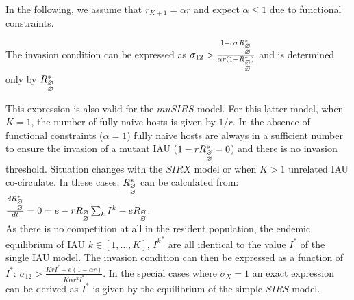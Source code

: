 In the following, we assume that $r_{K+1}=\alpha r$ and expect $\alpha
\leq 1$ due to functional constraints.

The invasion condition can be expressed as $\sigma_{12} > \frac{1-\alpha
  r R_{\begin{subarray}{l}\varnothing \\
      \varnothing \end{subarray}}^*}{\alpha
  r(1-R_{\begin{subarray}{l}\varnothing \\
      \varnothing \end{subarray}}^*)}$ and is determined only by
$R_{\begin{subarray}{l}\varnothing \\ \varnothing \end{subarray}}^*$


This expression is also valid for the $muSIRS$ model. For this latter
model, when $K=1$, the number of fully naive hosts is given by
$1/r$. In the absence of functional constraints ($\alpha=1$) fully
naive hosts are always in a sufficient number to ensure the invasion
of a mutant IAU ($1-r R_{\begin{subarray}{l}\varnothing \\
    \varnothing \end{subarray}}^*=0$) and there is no invasion
threshold.  Situation changes with the $SIRX$ model or when $K>1$
unrelated IAU co-circulate. In these cases,
$R_{\begin{subarray}{l}\varnothing \\ \varnothing \end{subarray}}^*$
can be calculated from: $\frac{dR_{\begin{subarray}{l}\varnothing \\
      \varnothing \end{subarray}}^*}{dt} = 0 = e -r
R_{\begin{subarray}{l}\varnothing \\ \varnothing \end{subarray}}
\sum_kI^k -e
R_{\begin{subarray}{l}\varnothing \\ \varnothing \end{subarray}}$.\\

As there is no competition at all in the resident population, the
endemic equilibrium of IAU $k \in [1,\dots,K]$, ${I^k}^*$ are all
identical to the value $I^*$ of the single IAU model.  The invasion
condition can then be expressed as a function of $I^*$:
$\sigma_{12}>\frac{KrI^*+e(1-\alpha r)}{K \alpha r^2 I^*}$.  In the
special cases where $\sigma_X=1$ an exact expression can be derived as
$I^*$ is given by the equilibrium of the simple $SIRS$ model.

